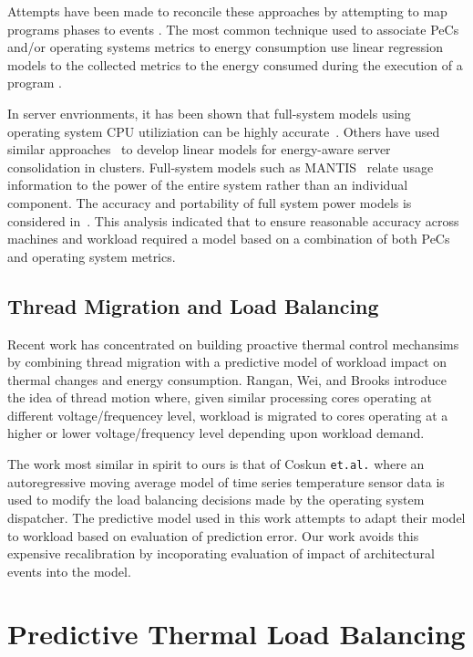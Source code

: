 \documentclass[times,10pt,onecolumn]{article}
\begin{document}
Attempts have been made to reconcile these approaches by attempting to
map programs phases to events \cite{Isci2006}.  The most common
technique used to associate PeCs and/or operating systems metrics to
energy consumption use linear regression models to the collected metrics
to the energy consumed during the execution of a program
\cite{Contreras2005}\cite{Economou2006}\cite{Isci2003b}\cite{Bircher2007}.

In server envrionments, it has been shown that full-system models
using operating system CPU utiliziation can be highly
accurate~\cite{Fan2007}. Others have used similar
approaches~\cite{Heath2005} to develop linear models for energy-aware
server consolidation in clusters.  Full-system models such as
MANTIS~\cite{Economou2006}\cite{Rivoire2008a} relate usage information
to the power of the entire system rather than an individual component.
The accuracy and portability of full system power models is considered
in~\cite{Rivoire2008b}.  This analysis indicated that to ensure
reasonable accuracy across machines and workload required a model based
on a combination of both PeCs and operating system metrics.

\subsection{Thread Migration and Load Balancing}
\label{sec:priorpredictive}
Recent work has concentrated on building proactive thermal control
mechansims by combining thread migration with a predictive model of
workload impact on thermal changes and energy consumption.   Rangan,
Wei, and Brooks \cite{Rangan2009} introduce the idea of thread motion
where, given similar processing cores operating at different
voltage/frequencey level, workload is migrated to cores operating at a
higher or lower voltage/frequency level depending upon workload demand. 

The work most similar in spirit to ours is that of Coskun
\texttt{et.al.} \cite{Coskun2008d} where an autoregressive moving
average model of time series temperature sensor data is used to modify
the load balancing decisions made by the operating system dispatcher.
The predictive model used in this work attempts to adapt their model to
workload based on evaluation of prediction error.  Our work avoids this
expensive recalibration by incoporating evaluation of impact of
architectural events into the model.

\section{Predictive Thermal Load Balancing}
\label{sec:policies}
\end{document}
